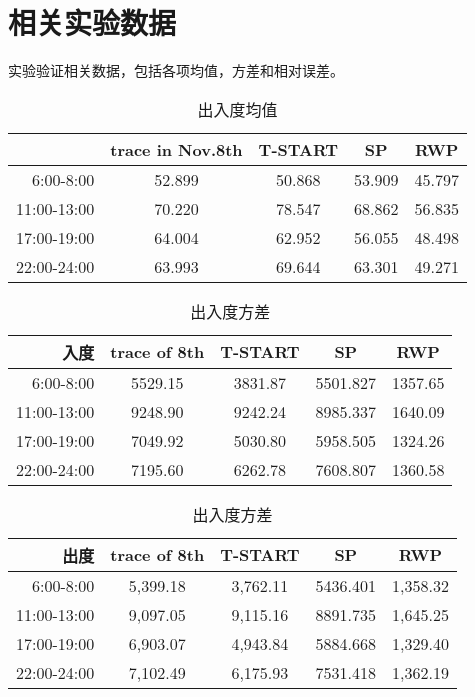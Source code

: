 \chapter{相关实验数据}

实验验证相关数据，包括各项均值，方差和相对误差。
\begin{table}[h]
\caption{出入度均值}\label{table_avg_inoutdegree}
\centering
\begin{tabular}{r|c|c|c|c}
\hline
	&trace in Nov.8th	&T-START &SP &RWP\\
\hline
6:00-8:00&
52.899&50.868&53.909&45.797\\
11:00-13:00&
70.220&78.547&68.862&56.835\\  
17:00-19:00&
64.004&62.952&56.055&48.498\\
22:00-24:00&
63.993&69.644&63.301&49.271\\	
\hline
\end{tabular}
\end{table}

\begin{table}[h]
\caption{出入度方差}\label{table_variance}
\centering
\begin{tabular}{r|c|c|c|c}
\hline
	入度&trace of 8th	&T-START &SP &RWP\\
\hline
 6:00-8:00	&
5529.15&	3831.87&5501.827&	1357.65\\ 
 11:00-13:00&
9248.90&	9242.24&	8985.337&	1640.09\\
 17:00-19:00&
7049.92&	5030.80&	5958.505&	1324.26\\
 22:00-24:00&
7195.60&	6262.78&	7608.807&	1360.58\\
\hline
\end{tabular}
\begin{tabular}{r|c|c|c|c}
	出度&trace of 8th	&T-START &SP &RWP\\
\hline
 6:00-8:00	&
5,399.18&3,762.11&5436.401&1,358.32\\
 11:00-13:00&
9,097.05&9,115.16&8891.735&1,645.25\\
 17:00-19:00&
6,903.07&4,943.84&5884.668&1,329.40\\
 22:00-24:00&
7,102.49&6,175.93&7531.418&1,362.19\\
\hline
\end{tabular}
\end{table}



